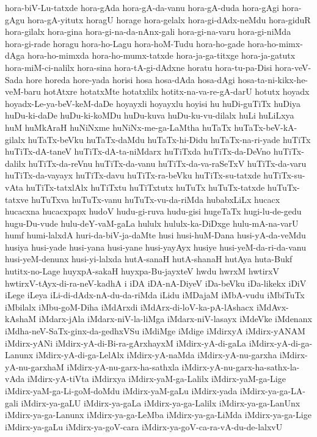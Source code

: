 {hora-biV-Lu-tatxde
hora-gAda
hora-gA-da-vanu
hora-gA-duda
hora-gAgi
hora-gAgu
hora-gA-yitutx
horagU
horage
hora-gelalx
hora-gi-dAdx-neMdu
hora-giduR
hora-gilalx
hora-gina
hora-gi-na-da-nAnx-gali
hora-gi-na-varu
hora-gi-niMda
hora-gi-rade
horagu
hora-ho-Lagu
hora-hoM-Tudu
hora-ho-gade
hora-ho-mimx-dAga
hora-ho-mimxda
hora-ho-mumx-tatxde
hora-ja-ga-titxge
hora-ja-gatutx
hora-miM-ci-nalilx
hora-sina
hora-tA-gi-dAdxne
horatu
hora-tu-pa-Disi
hora-veV-Sada
hore
horeda
hore-yada
horisi
hosa
hosa-dAda
hosa-dAgi
hosa-ta-ni-kikx-he-veM-baru
hotAtxre
hotatxMte
hotatxlilx
hotitx-na-va-re-gA-darU
hotutx
hoyadx
hoyadx-Le-ya-beV-keM-daDe
hoyayxli
hoyayxlu
hoyisi
hu
huDi-guTiTx
huDiya
huDu-ki-daDe
huDu-ki-koMDu
huDu-kuva
huDu-ku-vu-dilalx
huLi
huLiLxya
huM
huMkAraH
huNiNxme
huNiNx-me-ga-LaMtha
huTaTx
huTaTx-beV-kA-gilalx
huTaTx-beVku
huTaTx-daMdu
huTaTx-hi-Didu
huTaTx-na-ri-yade
huTiTx
huTiTx-dA-taneV
huTiTx-dA-ta-niMdarx
huTiTxda
huTiTx-da-DeVno
huTiTx-dalilx
huTiTx-da-reVnu
huTiTx-da-vanu
huTiTx-da-va-raSeTxV
huTiTx-da-varu
huTiTx-da-vayayx
huTiTx-davu
huTiTx-ra-beVku
huTiTx-su-tatxde
huTiTx-su-vAta
huTiTx-tatxlAlx
huTiTxtu
huTiTxtutx
huTuTx
huTuTx-tatxde
huTuTx-tatxve
huTuTxva
huTuTx-vanu
huTuTx-vu-da-riMda
hubabxLiLx
hucacx
hucacxna
hucacxpapx
hudoV
hudu-gi-ruva
hudu-gisi
hugeTaTx
hugi-lu-de-gedu
hugu-Du-vude
hulu-deY-vaM-gaLa
hululx
hululx-ka-DiDxge
hulu-mA-na-varU
humf
humi-lalxdA
huri-da-biV-ja-daMte
husi
husi-huM-Dana
husi-yA-da-veMdu
husiya
husi-yade
husi-yana
husi-yane
husi-yayAyx
husiye
husi-yeM-da-ri-da-vanu
husi-yeM-denunx
husi-yi-lalxda
hutA-sanaH
hutA-shanaH
hutAya
huta-Bukf
hutitx-no-Lage
huyxpA-sakaH
huyxpa-Bu-jayxteV
hwdu
hwrxM
hwtirxV
hwtirxV-tAyx-di-ra-neV-kadhA
i
iDA
iDA-nA-DiyeV
iDa-beVku
iDa-likekx
iDiV
iLege
iLeya
iLi-di-dAdx-nA-du-da-riMda
iLidu
iMDajaM
iMbA-vudu
iMbiTuTx
iMbilalx
iMbu-goM-Diha
iMdArxdi
iMdArx-di-loV-ka-pA-lAshacx
iMdAvx-kAshaM
iMdarx-jAla
iMdarx-niV-la-liMga
iMdarx-niV-lasayx
iMdeVke
iMdenanx
iMdha-neV-SaTx-ginx-da-gedhxVSu
iMdiMge
iMdige
iMdirxyA
iMdirx-yANAM
iMdirx-yANi
iMdirx-yA-di-Bi-ra-gArxhayxM
iMdirx-yA-di-gaLa
iMdirx-yA-di-ga-Lanunx
iMdirx-yA-di-ga-LelAlx
iMdirx-yA-naMda
iMdirx-yA-nu-garxha
iMdirx-yA-nu-garxhaM
iMdirx-yA-nu-garx-ha-sathxla
iMdirx-yA-nu-garx-ha-sathx-la-vAda
iMdirx-yA-tiVta
iMdirxya
iMdirx-yaM-ga-Lalilx
iMdirx-yaM-ga-Lige
iMdirx-yaM-ga-Li-goM-doMdu
iMdirx-yaM-gaLu
iMdirx-yada
iMdirx-ya-ga-LA-gali
iMdirx-ya-gaLU
iMdirx-ya-gaLa
iMdirx-ya-ga-Lalilx
iMdirx-ya-ga-LanUnx
iMdirx-ya-ga-Lanunx
iMdirx-ya-ga-LeMba
iMdirx-ya-ga-LiMda
iMdirx-ya-ga-Lige
iMdirx-ya-gaLu
iMdirx-ya-goV-cara
iMdirx-ya-goV-ca-ra-vA-du-de-lalxvU
}
